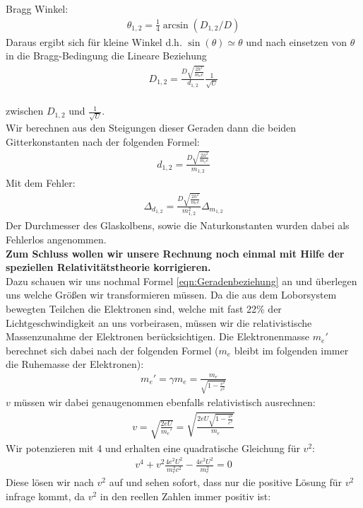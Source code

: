 \documentclass[12pt,a4paper]{article}
\begin{document}
Bragg Winkel:
\begin{align}
\theta_{1,2} = \frac{1}{4}\arcsin(D_{1,2}/D)
\end{align}
Daraus ergibt sich für kleine Winkel d.h. $\sin(\theta) \simeq \theta$ und nach einsetzen von $\theta$ in die Bragg-Bedingung die Lineare Beziehung
\begin{align}
D_{1,2} = \frac{D\sqrt{\frac{2h^2}{m_ee}}}{d_{1,2}}\frac{1}{\sqrt{U}}
\label{eqn:Geradenbeziehung}
\end{align}\\
zwischen $D_{1,2}$ und $\frac{1}{\sqrt{U}}$.\\
Wir berechnen aus den Steigungen dieser Geraden dann die beiden Gitterkonstanten nach der folgenden Formel:
\begin{align}
d_{1,2} = \frac{D\sqrt{\frac{2h^2}{m_ee}}}{m_{1,2}}
\label{eqn:d}
\end{align}
Mit dem Fehler:
\begin{align}
\Delta_{d_{1,2}} = \frac{D\sqrt{\frac{2h^2}{m_ee}}}{m_{1,2}^2}\Delta_{m_{1,2}}
\label{eqn:d_delta}
\end{align}
Der Durchmesser des Glaskolbens, sowie die Naturkonstanten wurden dabei als Fehlerlos angenommen.\\
\textbf{Zum Schluss wollen wir unsere Rechnung noch einmal mit Hilfe der speziellen Relativitätstheorie korrigieren.}\\
Dazu schauen wir uns nochmal Formel \ref{eqn:Geradenbeziehung} an und überlegen uns welche Größen wir transformieren müssen. Da die aus dem Loborsystem bewegten Teilchen die Elektronen sind, welche mit fast 22\% der Lichtgeschwindigkeit an uns vorbeirasen, müssen wir die relativistische Massenzunahme der Elektronen berücksichtigen.
Die Elektronenmasse $m_e'$ berechnet sich dabei nach der folgenden Formel ($m_e$ bleibt im folgenden immer die Ruhemasse der Elektronen):
\begin{align}
m_e' = \gamma m_e = \frac{m_e}{\sqrt{1-\frac{v^2}{c^2}}}
\end{align}
$v$ müssen wir dabei genaugenommen ebenfalls relativistisch ausrechnen:
\begin{align}
v = \sqrt{\frac{2eU}{m_e'}} = \sqrt{\frac{2eU\sqrt{1-\frac{v^2}{c^2}}}{m_e}}
\end{align}
Wir potenzieren mit 4 und erhalten eine quadratische Gleichung für $v^2$:
\begin{align}
v^4 + v^2\frac{4 e^2 U^2}{m_e^2 c^2} - \frac{4 e^2 U^2}{m_e^2} = 0
\end{align}
Diese lösen wir nach $v^2$ auf und sehen sofort, dass nur die positive Lösung für $v^2$ infrage kommt, da $v^2$ in den reellen Zahlen immer positiv ist:
\end{document}
